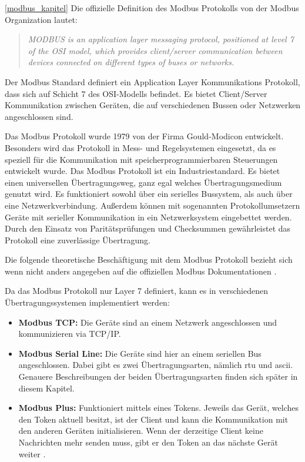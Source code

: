 \ref{modbus_kapitel}
Die offizielle Definition des Modbus Protokolls von der Modbus Organization \cite{Modbus_Organization_AP:2012} lautet:
\begin{quotation}
	\emph{
		MODBUS is an application layer messaging protocol, positioned at level 7 of the OSI model, which provides client/server communication between devices connected on different types of buses or networks.}
\end{quotation}

Der Modbus Standard definiert ein Application Layer Kommunikations Protokoll, dass sich auf Schicht 7 des OSI-Modells befindet. Es bietet Client/Server Kommunikation zwischen Geräten, die auf verschiedenen Bussen oder Netzwerken angeschlossen sind.

Das Modbus Protokoll wurde 1979 von der Firma Gould-Modicon entwickelt. Besonders wird das Protokoll in Mess- und Regelsystemen eingesetzt, da es speziell für die Kommunikation mit speicherprogrammierbaren Steuerungen entwickelt wurde. Das Modbus Protokoll ist ein Industriestandard. Es bietet einen universellen Übertragungsweg, ganz egal welches Übertragungsmedium genutzt wird. Es funktioniert sowohl über ein serielles Bussystem, als auch über eine Netzwerkverbindung. Außerdem können mit sogenannten Protokollumsetzern Geräte mit serieller Kommunikation in ein Netzwerksystem eingebettet werden. Durch den Einsatz von Paritätsprüfungen und Checksummen gewährleistet das Protokoll eine zuverlässige Übertragung. \cite{KUNBUS_GmbH:o.J., kvm-concepts_GmbH:2022}


Die folgende theoretische Beschäftigung mit dem Modbus Protokoll bezieht sich wenn nicht anders angegeben auf die offiziellen Modbus Dokumentationen \cite{Modbus_Organization_AP:2012, Modbus_Organization_SL:2012}. 

Da das Modbus Protokoll nur Layer 7 definiert, kann es in verschiedenen Übertragungssystemen implementiert werden:
\begin{itemize}
	\item \textbf{Modbus TCP:} Die Geräte sind an einem Netzwerk angeschlossen und kommunizieren via TCP/IP.
	\item \textbf{Modbus Serial Line:} Die Geräte sind hier an einem seriellen Bus angeschlossen. Dabei gibt es zwei Übertragungsarten, nämlich \acs{rtu} und \acs{ascii}. Genauere Beschreibungen der beiden Übertragungsarten finden sich später in diesem Kapitel.
	\item \textbf{Modbus Plus:} Funktioniert mittels eines Tokens. Jeweils das Gerät, welches den Token aktuell besitzt, ist der Client und kann die Kommunikation mit den anderen Geräten initialisieren. Wenn der derzeitige Client keine Nachrichten mehr senden muss, gibt er den Token an das nächste Gerät weiter \cite{Rinaldi:2016}.
\end{itemize}

